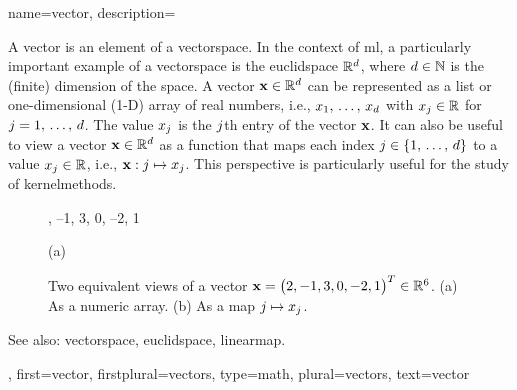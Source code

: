 {name={vector},
	description={A vector is an element of a \gls{vectorspace}. 
		In the context of \gls{ml}, a particularly important example of a \gls{vectorspace} 
		is the \gls{euclidspace} $\mathbb{R}^{d}$, where $d \in \mathbb{N}$ 
		is the (finite) dimension of the space. A vector ${\bf x} \in \mathbb{R}^{d}$ 
		can be represented as a list or one-dimensional (1-D) array of real numbers, i.e., 
		$x_1, \,\ldots, \,x_{d}$ with $x_j \in \mathbb{R}$ for 
		$j = 1, \,\ldots, \,d$. The value $x_j$ is the $j$th 
		entry of the vector ${\bf x}$. It can also be useful to view a vector ${\bf x} \in \mathbb{R}^{d}$ 
		as a \gls{function} that maps each index $j \in \{1, \,\ldots, \,d\}$ 
		to a value $x_j \in \mathbb{R}$, i.e., ${\bf x}: j \mapsto x_j$. 
		This perspective is particularly useful for the study of \glspl{kernelmethod}.
		\begin{figure}[H]
			\begin{minipage}[c]{0.48\textwidth}
				, --1, 3, 0, --2, 1
				\begin{minipage}{\textwidth}
				\vspace{5ex}
				\centering
				{\selectfont (a)}
				\end{minipage}
			\end{minipage}
			\hfill
			\begin{minipage}{0.48\textwidth}
			\centering
			\end{minipage}
			\caption{Two equivalent views of a vector ${\bf x}= \big( 2, -1, 3, 0, -2, 1 \big)^{T} \in \mathbb{R}^{6}$.
			(a) As a numeric array. (b) As a \gls{map} $j \mapsto x_j$.}
			\label{fig:vector-function-dual_dict}
		\end{figure}
		See also: \gls{vectorspace}, \gls{euclidspace}, \gls{linearmap}.},
	first={vector},
	firstplural={vectors},
	type=math,
	plural={vectors},
	text={vector}
}


